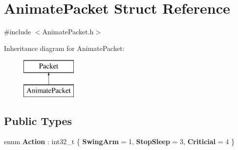 \hypertarget{struct_animate_packet}{}\section{Animate\+Packet Struct Reference}
\label{struct_animate_packet}


{\ttfamily \#include $<$Animate\+Packet.\+h$>$}

Inheritance diagram for Animate\+Packet\+:\begin{figure}[H]
\begin{center}
\leavevmode
\includegraphics[height=2.000000cm]{struct_animate_packet}
\end{center}
\end{figure}
\subsection*{Public Types}
\begin{DoxyCompactItemize}
\item 
\mbox{\label{struct_animate_packet_a032d46bf8c28705852864092167646b0}} 
enum {\bfseries Action} \+: int32\+\_\+t \{ {\bfseries Swing\+Arm} = 1, 
{\bfseries Stop\+Sleep} = 3, 
{\bfseries Criticial} = 4
 \}
\end{DoxyCompactItemize}
